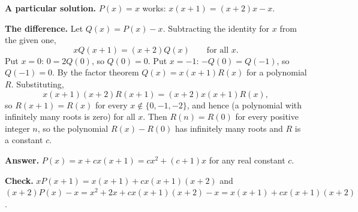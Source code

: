 \textbf{A particular solution.} $P(x)=x$ works: $x(x+1)=(x+2)x-x$.

\textbf{The difference.} Let $Q(x)=P(x)-x$. Subtracting the identity for $x$ from the given one,
\[xQ(x+1)=(x+2)Q(x)\qquad\text{for all }x.\]
Put $x=0$: $0=2Q(0)$, so $Q(0)=0$. Put $x=-1$: $-Q(0)=Q(-1)$, so $Q(-1)=0$. By the factor theorem $Q(x)=x(x+1)R(x)$ for a polynomial $R$. Substituting,
\[x(x+1)(x+2)R(x+1)=(x+2)x(x+1)R(x),\]
so $R(x+1)=R(x)$ for every $x\notin\{0,-1,-2\}$, and hence (a polynomial with infinitely many roots is zero) for all $x$. Then $R(n)=R(0)$ for every positive integer $n$, so the polynomial $R(x)-R(0)$ has infinitely many roots and $R$ is a constant $c$.

\textbf{Answer.} $P(x)=x+cx(x+1)=\boxed{cx^2+(c+1)x}$ for any real constant $c$.

\textbf{Check.} $xP(x+1)=x(x+1)+cx(x+1)(x+2)$ and $(x+2)P(x)-x=x^2+2x+cx(x+1)(x+2)-x=x(x+1)+cx(x+1)(x+2)$.
